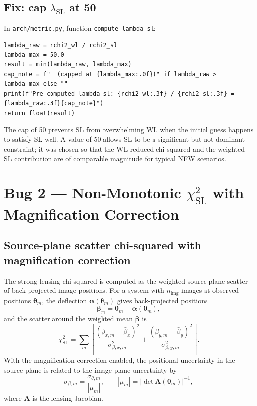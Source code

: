 \documentclass[12pt]{article}
\begin{document}
\subsection{Fix: cap \texorpdfstring{$\lambda_\mathrm{SL}$}{lambda\_SL} at 50}

In \texttt{arch/metric.py}, function \texttt{compute\_lambda\_sl}:

\begin{lstlisting}
lambda_raw = rchi2_wl / rchi2_sl
lambda_max = 50.0
result = min(lambda_raw, lambda_max)
cap_note = f"  (capped at {lambda_max:.0f})" if lambda_raw > lambda_max else ""
print(f"Pre-computed lambda_sl: {rchi2_wl:.3f} / {rchi2_sl:.3f} = {lambda_raw:.3f}{cap_note}")
return float(result)
\end{lstlisting}

The cap of 50 prevents SL from overwhelming WL when the initial guess happens to
satisfy SL well.  A value of 50 allows SL to be a significant but not dominant
constraint; it was chosen so that the WL reduced chi-squared and the weighted SL
contribution are of comparable magnitude for typical NFW scenarios.

\section{Bug 2 --- Non-Monotonic \texorpdfstring{$\chi^2_\mathrm{SL}$}{chi2\_SL} with Magnification Correction}
\label{sec:bug2}

\subsection{Source-plane scatter chi-squared with magnification correction}

The strong-lensing chi-squared is computed as the weighted source-plane scatter of
back-projected image positions.  For a system with $n_\mathrm{img}$ images at observed
positions $\boldsymbol\theta_m$, the deflection $\boldsymbol\alpha(\boldsymbol\theta_m)$
gives back-projected positions
\begin{equation}
  \boldsymbol\beta_m = \boldsymbol\theta_m - \boldsymbol\alpha(\boldsymbol\theta_m),
\end{equation}
and the scatter around the weighted mean $\bar{\boldsymbol\beta}$ is
\begin{equation}
  \chi^2_\mathrm{SL} = \sum_m
  \left[\frac{(\beta_{x,m} - \bar\beta_x)^2}{\sigma_{\beta,x,m}^2}
        + \frac{(\beta_{y,m} - \bar\beta_y)^2}{\sigma_{\beta,y,m}^2}\right].
\end{equation}
With the magnification correction enabled, the positional uncertainty in the source
plane is related to the image-plane uncertainty by
\begin{equation}
  \sigma_{\beta,m} = \frac{\sigma_{\theta,m}}{|\mu_m|},
  \qquad |\mu_m| = |\det\mathbf{A}(\boldsymbol\theta_m)|^{-1},
\end{equation}
where $\mathbf{A}$ is the lensing Jacobian.
\end{document}
